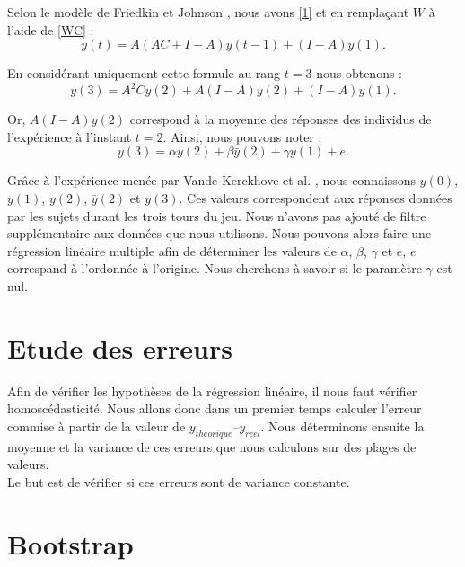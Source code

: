 \documentclass{scrreprt}
\begin{document}
\begin{multicols}{2}
Selon le modèle de Friedkin et Johnson \cite{FJ}, nous avons \eqref{1} et en remplaçant $W$ à l’aide de \eqref{WC} :\\

\begin{equation}
\label{21}
y(t) =A(AC+I-A)y(t-1)+(I-A)y(1).
\end{equation}

En considérant uniquement cette formule au rang $t = 3$ nous obtenons :\\
\begin{equation}
\label{22}
y(3) = A^2C y(2) + A(I-A)y(2) + (I-A)y(1).
\end{equation}

Or, $A(I-A)y(2)$ correspond à la moyenne des réponses des individus de l'expérience à l'instant $t=2$. Ainsi, nous pouvons noter :\\
\begin{equation}
\label{23}
y(3) = \alpha y(2) + \beta \bar{y}(2) + \gamma y(1) + e.
\end{equation}

Grâce à l’expérience menée par Vande Kerckhove et al. \cite{VMG}, nous connaissons $y(0)$, $y(1)$, $y(2)$, $\bar{y}(2)$ et $y(3)$. Ces valeurs correspondent aux réponses données par les sujets durant les trois tours du jeu. Nous n’avons pas ajouté de filtre supplémentaire aux données que nous utilisons. Nous pouvons alors faire une régression linéaire multiple afin de déterminer les valeurs de $\alpha$, $\beta$, $\gamma$ et $e$, $e$ correspand à l'ordonnée à l'origine. Nous cherchons à savoir si le paramètre $\gamma$ est nul.\\

\section{Etude des erreurs}

Afin de vérifier les hypothèses de la régression linéaire, il nous faut vérifier homoscédasticité. Nous allons donc dans un premier temps calculer l’erreur commise à partir de la valeur de $y_{theorique} – y_{reel}$. Nous déterminons ensuite la moyenne et la variance de ces erreurs que nous calculons sur des plages de valeurs.\\

Le but est de vérifier si ces erreurs sont de variance constante.\\

\section{Bootstrap}


\end{multicols}
\end{document}
